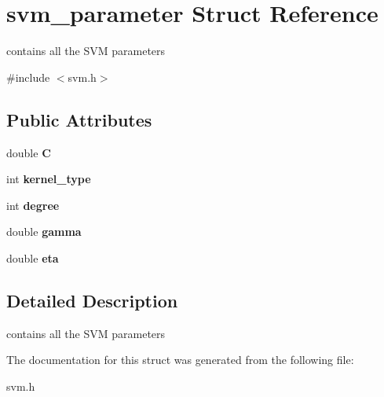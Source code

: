 \hypertarget{structsvm__parameter}{\section{svm\+\_\+parameter Struct Reference}
\label{structsvm__parameter}
}


contains all the S\+V\+M parameters  




{\ttfamily \#include $<$svm.\+h$>$}

\subsection*{Public Attributes}
\begin{DoxyCompactItemize}
\item 
\hypertarget{structsvm__parameter_af4f905a3f7d589d86964289af3c9d812}{double {\bfseries C}}\label{structsvm__parameter_af4f905a3f7d589d86964289af3c9d812}

\item 
\hypertarget{structsvm__parameter_a4188713ba31fc3d101244a6bcc09a760}{int {\bfseries kernel\+\_\+type}}\label{structsvm__parameter_a4188713ba31fc3d101244a6bcc09a760}

\item 
\hypertarget{structsvm__parameter_afef1c4508ec0045c236a3308b0fa5138}{int {\bfseries degree}}\label{structsvm__parameter_afef1c4508ec0045c236a3308b0fa5138}

\item 
\hypertarget{structsvm__parameter_a91667b90506e171482b5fc619377110d}{double {\bfseries gamma}}\label{structsvm__parameter_a91667b90506e171482b5fc619377110d}

\item 
\hypertarget{structsvm__parameter_add4e0104c8b90bcb854dc5c8010cb02c}{double {\bfseries eta}}\label{structsvm__parameter_add4e0104c8b90bcb854dc5c8010cb02c}

\end{DoxyCompactItemize}


\subsection{Detailed Description}
contains all the S\+V\+M parameters 

The documentation for this struct was generated from the following file\+:\begin{DoxyCompactItemize}
\item 
svm.\+h\end{DoxyCompactItemize}
